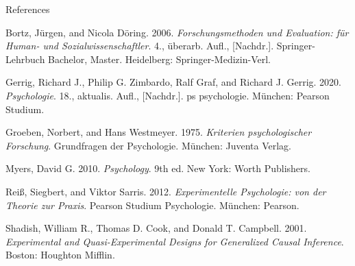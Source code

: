 \documentclass[
  8pt,
  ignorenonframetext,
]{beamer}
\newlength{\cslhangindent}
\newlength{\cslentryspacingunit} %
\newenvironment{CSLReferences}[2] %
 {%
  \setlength{\parindent}{0pt}
  \ifodd #1
  \let\oldpar\par
  \def\par{\hangindent=\cslhangindent\oldpar}
  \fi
  \setlength{\parskip}{#2\cslentryspacingunit}
 }%
 {}
\begin{document}
\begin{frame}{References}
\protect\hypertarget{references}{}
\footnotesize

\hypertarget{refs}{}
\begin{CSLReferences}{1}{0}
\leavevmode{}%
Bortz, Jürgen, and Nicola Döring. 2006. \emph{{Forschungsmethoden und
Evaluation: für Human- und Sozialwissenschaftler}}. 4., überarb. Aufl.,
{[}Nachdr.{]}. {Springer-Lehrbuch Bachelor, Master}. {Heidelberg}:
{Springer-Medizin-Verl}.

\leavevmode{}%
Gerrig, Richard J., Philip G. Zimbardo, Ralf Graf, and Richard J.
Gerrig. 2020. \emph{{Psychologie}}. 18., aktualis. Aufl., {[}Nachdr.{]}.
{ps psychologie}. {München}: {Pearson Studium}.

\leavevmode{}%
Groeben, Norbert, and Hans Westmeyer. 1975. \emph{{Kriterien
psychologischer Forschung}}. {Grundfragen der Psychologie}. {München}:
{Juventa Verlag}.

\leavevmode{}%
Myers, David G. 2010. \emph{Psychology}. 9th ed. {New York}: {Worth
Publishers}.

\leavevmode{}%
Reiß, Siegbert, and Viktor Sarris. 2012. \emph{{Experimentelle
Psychologie: von der Theorie zur Praxis}}. {Pearson Studium
Psychologie}. {München}: {Pearson}.

\leavevmode{}%
Shadish, William R., Thomas D. Cook, and Donald T. Campbell. 2001.
\emph{Experimental and Quasi-Experimental Designs for Generalized Causal
Inference}. {Boston}: {Houghton Mifflin}.

\end{CSLReferences}
\end{frame}
\end{document}
